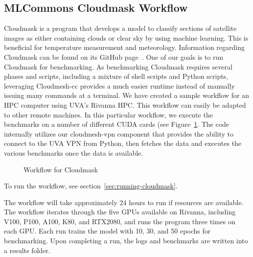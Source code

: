 
\subsection{MLCommons Cloudmask Workflow}
\label{cloudmask-workflow}

Cloudmask is a program that develops a model to classify sections of
satellite images as either containing clouds or clear sky by using
machine learning. This is beneficial for temperature measurement and
meteorology.  Information regarding Cloudmask can be found on its
GitHub page~\cite{www-cloudmask}.
One of our goals is to run Cloudmask for benchmarking.
As benchmarking Cloudmask requires
several phases and scripts, including a mixture of shell scripts and
Python scripts, leveraging Cloudmesh-cc provides a much easier runtime
instead of manually issuing many commands at a terminal.
We have created a sample workflow for an HPC
computer using UVA's Rivanna HPC. 
This workflow can easily be adapted to other remote machines. In this
particular workflow, we execute the benchmarks on a number of different
CUDA cards (see Figure~\ref{fig:cloudmaskwf}. The code internally utilizes
our cloudmesh-vpn component that provides the ability to
connect to the UVA VPN from Python, then fetches the data and executes
the various benchmarks once the data is available.


\begin{figure}[htb]
  \vspace{-1cm}
  \caption{Workflow for Cloudmask}\label{fig:cloudmaskwf}
\end{figure}

To run the workflow, see section~\ref{sec:running-cloudmask}.

The workflow will take approximately 24 hours to run if resources are
available. The workflow iterates through the five GPUs available on
Rivanna, including V100, P100, A100, K80, and RTX2080, and runs the program
three times on each GPU. Each run trains the model with 10, 30, and 50
epochs for benchmarking. Upon completing a run, the logs and
benchmarks are written into a results folder.

